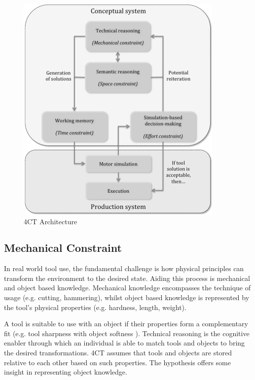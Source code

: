 \documentclass[11]{article}
\begin{document}
\begin{figure}[h]
	\includegraphics[width=0.9\textwidth]{4CTArchitecture.png}
	\caption{4CT Architecture\cite{osiurak2014}}
	\centering
	\label{fig:4CTArcithecture}
\end{figure}

\subsection{Mechanical Constraint}
In real world tool use, the fundamental challenge is how physical principles can transform the environment to the desired state. Aiding this process is mechanical and object based knowledge. Mechanical knowledge encompasses the technique of usage (e.g. cutting, hammering), whilst object based knowledge is represented by the tool's physical properties (e.g. hardness, length, weight). 

A tool is suitable to use with an object if their properties form a complementary fit (e.g. tool sharpness with object softness ). Technical reasoning is the cognitive enabler through which an individual is able to match tools and objects to bring the desired transformations. 4CT assumes that tools and objects are stored relative to each other based on such properties. The hypothesis offers some insight in representing object knowledge. 
\end{document}
